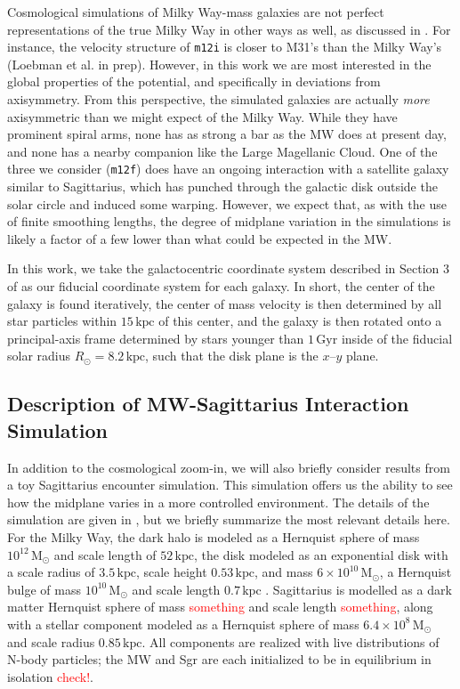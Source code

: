 \documentclass[twocolumn]{aastex62}
\newcommand{\Gus}[1]{\textcolor{red}{#1}}
\newcommand{\Msun}{\ensuremath{\text{M}_\odot}}
\newcommand{\kpc}{\text{kpc}}
\newcommand{\Gyr}{\text{Gyr}}
\newcommand{\mi}{\texttt{m12i}}
\newcommand{\mf}{\texttt{m12f}}
\begin{document}
Cosmological simulations of Milky Way-mass galaxies are not perfect
representations of the true Milky Way in other ways as well, as discussed in
\citet{2018arXiv180610564S}. For instance, the velocity structure of \mi{} is
closer to M31's than the Milky Way's (Loebman et al. in prep). However, in
this work we are most interested in the global properties of the potential,
and specifically in deviations from axisymmetry. From this perspective, the
simulated galaxies are actually \emph{more} axisymmetric than we might expect
of the Milky Way. While they have prominent spiral arms, none has as strong a
bar as the MW does at present day, and none has a nearby companion like the
Large Magellanic Cloud. One of the three we consider (\mf) does have an
ongoing interaction with a satellite galaxy similar to Sagittarius, which has
punched through the galactic disk outside the solar circle and induced some
warping. However, we expect that, as with the use of finite smoothing lengths,
the degree of midplane variation in the simulations is likely a factor of a
few lower than what could be expected in the MW.

In this work, we take the galactocentric coordinate system described in
Section 3 of \citet{2018arXiv180610564S} as our fiducial coordinate system for
each galaxy. In short, the center of the galaxy is found iteratively, the
center of mass velocity is then determined by all star particles within
$15\,\kpc$ of this center, and the galaxy is then rotated onto a
principal-axis frame determined by stars younger than $1\,\Gyr$ inside of the
fiducial solar radius $R_{\odot} = 8.2\,\kpc$, such that the disk plane is the
$x$--$y$ plane.

\subsection{Description of MW-Sagittarius Interaction Simulation} 
\label{ssec:sag_sim}
In addition to the cosmological zoom-in, we will also briefly consider results
from a toy Sagittarius encounter simulation. This simulation offers us the
ability to see how the midplane varies in a more controlled environment. The
details of the simulation are given in \citet{2018MNRAS.481..286L}, but we
briefly summarize the most relevant details here. For the Milky Way, the dark
halo is modeled as a Hernquist sphere of mass $10^{12}\,\Msun$ and scale
length of $52\,\kpc$, the disk modeled as an exponential disk with a scale
radius of $3.5\,\kpc$, scale height $0.53\,\kpc$, and mass
$6\times10^{10}\,\Msun$, a Hernquist bulge of mass $10^{10}\,\Msun$ and scale
length $0.7\,\kpc$ \citep{1990ApJ...356..359H}. Sagittarius is modelled as a
dark matter Hernquist sphere of mass \Gus{something} and scale length
\Gus{something}, along with a stellar component modeled as a Hernquist sphere
of mass $6.4\times10^8\,\Msun$ and scale radius $0.85\,\kpc$. All components
are realized with live distributions of N-body particles; the MW and Sgr are
each initialized to be in equilibrium in isolation \Gus{check!}.
\end{document}
